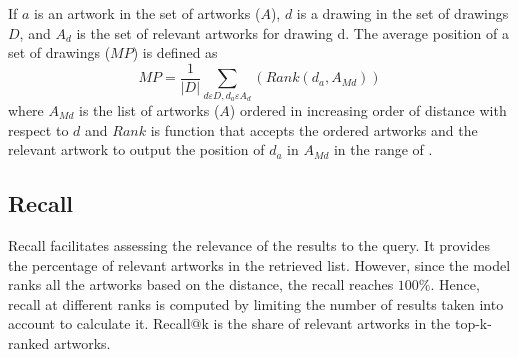 If \begin{math} a \end{math} is an artwork in the set of artworks (\begin{math} A \end{math}), \begin{math} d \end{math} is a drawing in the set of drawings \begin{math} D \end{math}, and \begin{math} {A}_{d} \end{math} is the set of relevant artworks for drawing d. The average position of a set of drawings (\begin{math} MP \end{math}) is defined as
\begin{displaymath} 
MP = \frac{1}{\left | D \right |}\sum_{d\varepsilon D, {d}_{a} \varepsilon {A}_{d}} (Rank({d}_{a}, {A}_{Md}))
\end{displaymath}
where \begin{math} {A}_{Md} \end{math} is the list of artworks (\begin{math} A \end{math}) ordered in increasing order of distance with respect to \begin{math} d \end{math} and \begin{math} Rank \end{math} is function that accepts the ordered artworks and the relevant artwork to output the position of \begin{math} {d}_{a} \end{math} in \begin{math} {A}_{Md} \end{math} in the range of \begin{math} [0, \left | A \right | - 1 ] \end{math}.

\subsection{Recall}\label{chap:4:sec:metrics-descrp:recall}

Recall facilitates assessing the relevance of the results to the query. It provides the percentage of relevant artworks in the retrieved list. However, since the model ranks all the artworks based on the distance, the recall reaches \begin{math} 100\% \end{math}. Hence, recall at different ranks is computed by limiting the number of results taken into account to calculate it. Recall@k is the share of relevant artworks in the top-k-ranked artworks.

